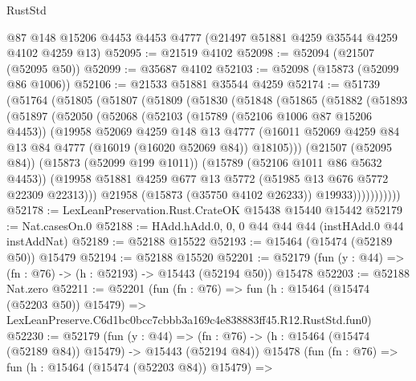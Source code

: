 \begin{lexlean}{RustStd}
\begin{coremodule}
    @87
    @148
    @15206
    @4453
    @4453
    @4777
    (@21497 @51881 @4259 @35544 @4259 @4102 @4259 @13)
@52095 := @21519 @4102
@52098 := @52094 (@21507 (@52095 @50))
@52099 := @35687 @4102
@52103 := @52098 (@15873 (@52099 @86 @1006))
@52106 := @21533 @51881 @35544 @4259
@52174 := @51739
    (@51764
      (@51805
        (@51807
          (@51809
            (@51830
              (@51848
                (@51865
                  (@51882
                    (@51893
                      (@51897
                        (@52050
                          (@52068
                            (@52103
                              (@15789 (@52106 @1006 @87 @15206 @4453))
                              (@19958
                                @52069
                                @4259
                                @148
                                @13
                                @4777
                                (@16011
                                  @52069
                                  @4259
                                  @84
                                  @13
                                  @84
                                  @4777
                                  (@16019 (@16020 @52069 @84))
                                  @18105)))
                            (@21507 (@52095 @84))
                            (@15873 (@52099 @199 @1011))
                            (@15789 (@52106 @1011 @86 @5632 @4453))
                            (@19958
                              @51881
                              @4259
                              @677
                              @13
                              @5772
                              (@51985 @13 @676 @5772 @22309 @22313)))
                          @21958
                          (@15873 (@35750 @4102 @26233))
                          @19933)))))))))))
@52178 := LexLeanPreservation.Rust.CrateOK @15438 @15440 @15442
@52179 := Nat.casesOn.{0}
@52188 := HAdd.hAdd.{0, 0, 0} @44 @44 @44 (instHAdd.{0} @44 instAddNat)
@52189 := @52188 @15522
@52193 := @15464 (@15474 (@52189 @50)) @15479
@52194 := @52188 @15520
@52201 := @52179 (fun (y : @44) => (fn : @76) -> (h : @52193) -> @15443 (@52194 @50)) @15478
@52203 := @52188 Nat.zero
@52211 := @52201
    (fun (fn : @76) =>
    fun (h : @15464 (@15474 (@52203 @50)) @15479) =>
    LexLeanPreserve.C6d1bc0bcc7cbbb3a169c4e838883ff45.R12.RustStd.fun0)
@52230 := @52179
    (fun (y : @44) =>
    (fn : @76) -> (h : @15464 (@15474 (@52189 @84)) @15479) -> @15443 (@52194 @84))
    @15478
    (fun (fn : @76) =>
    fun (h : @15464 (@15474 (@52203 @84)) @15479) =>

\end{coremodule}
\end{lexlean}
